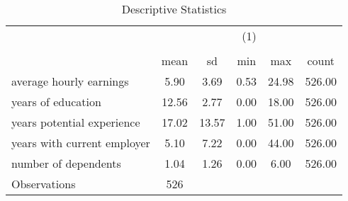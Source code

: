 \begin{table}[htbp]\centering
\def\sym#1{\ifmmode^{#1}\else\(^{#1}\)\fi}
\caption{Descriptive Statistics}
\label{tab:0201-descriptive_statistics}
\begin{tabular}{l*{1}{ccccc}}
\toprule
                    &\multicolumn{5}{c}{(1)}                                         \\
                    &\multicolumn{5}{c}{}                                            \\
                    &        mean&          sd&         min&         max&       count\\
\midrule
average hourly earnings&        5.90&        3.69&        0.53&       24.98&      526.00\\
years of education  &       12.56&        2.77&        0.00&       18.00&      526.00\\
years potential experience&       17.02&       13.57&        1.00&       51.00&      526.00\\
years with current employer&        5.10&        7.22&        0.00&       44.00&      526.00\\
number of dependents&        1.04&        1.26&        0.00&        6.00&      526.00\\
\midrule
Observations        &         526&            &            &            &            \\
\bottomrule
\end{tabular}
\end{table}
